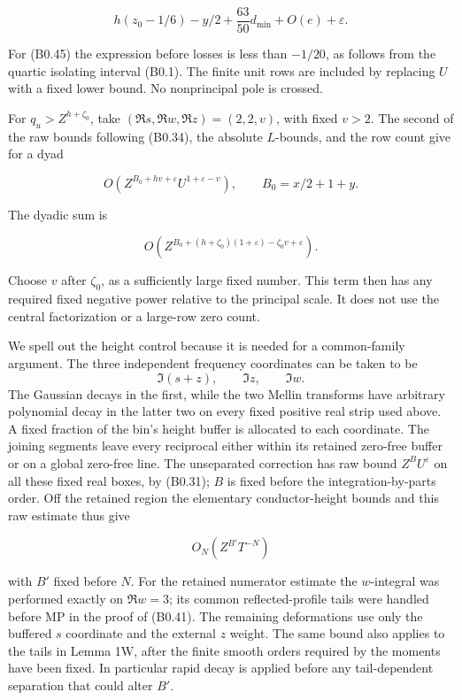 \documentclass[11pt,a4paper]{article}
\begin{document}
\[
h(z_0-1/6)-y/2+\frac{63}{50}d_{\min}+O(e)+\varepsilon.
\tag{B0.56}
\]

For (B0.45) the expression before losses is less than \(-1/20\), as
follows from the quartic isolating interval (B0.1). The finite unit rows
are included by replacing \(U\) with a fixed lower bound. No
nonprincipal pole is crossed.

For \(q_u>Z^{h+\zeta_0}\), take \((\Re s,\allowbreak{}\Re w,\allowbreak{}\Re z)=(2,\allowbreak{}2,\allowbreak{}v)\), with
fixed \(v>2\). The second of the raw bounds following (B0.34), the
absolute \(L\)-bounds, and the row count give for a dyad

\[
O\!\left(Z^{B_0+hv+\varepsilon}U^{1+\varepsilon-v}\right),
\qquad B_0=x/2+1+y.
\]

The dyadic sum is

\[
O\!\left(
 Z^{B_0+(h+\zeta_0)(1+\varepsilon)-\zeta_0v+\varepsilon}
\right).
\tag{B0.57}
\]

Choose \(v\) after \(\zeta_0\), as a sufficiently large fixed number.
This term then has any required fixed negative power relative to the
principal scale. It does not use the central factorization or a
large-row zero count.

We spell out the height control because it is needed for a common-family
argument. The three independent frequency coordinates can be taken to be
\[
\Im(s+z),\qquad\Im z,\qquad\Im w.
\] The Gaussian decays in the first, while the two Mellin transforms
have arbitrary polynomial decay in the latter two on every fixed
positive real strip used above. A fixed fraction of the bin's height
buffer is allocated to each coordinate. The joining segments leave every
reciprocal either within its retained zero-free buffer or on a global
zero-free line. The unseparated correction has raw bound
\(Z^B U^\varepsilon\) on all these fixed real boxes, by (B0.31); \(B\)
is fixed before the integration-by-parts order. Off the retained region
the elementary conductor-height bounds and this raw estimate thus give

\[
O_N(Z^{B'}T^{-N})
\tag{B0.58}
\]

with \(B'\) fixed before \(N\). For the retained numerator estimate the
\(w\)-integral was performed exactly on \(\Re w=3\); its common
reflected-profile tails were handled before MP in the proof of (B0.41).
The remaining deformations use only the buffered \(s\) coordinate and
the external \(z\) weight. The same bound also applies to the tails in
Lemma 1W, after the finite smooth orders required by the moments have
been fixed. In particular rapid decay is applied before any
tail-dependent separation that could alter \(B'\).
\end{document}
